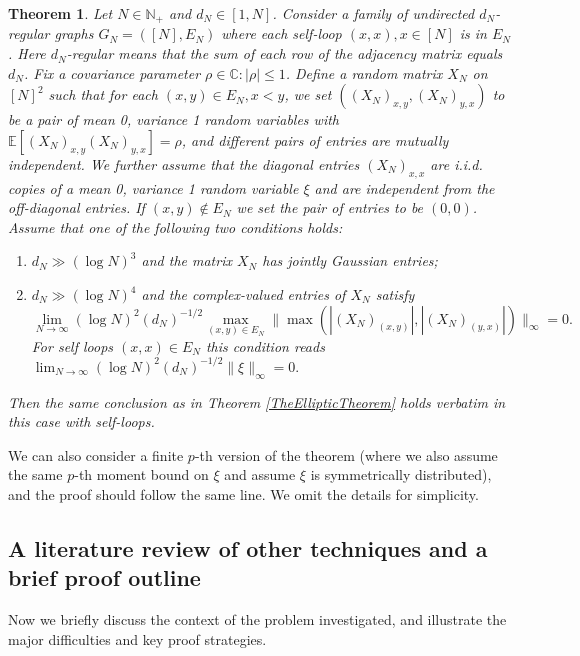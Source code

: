 \documentclass[11pt,reqno]{amsart}
\theoremstyle{plain}
\newtheorem{theorem}{Theorem}[section]
\theoremstyle{remark}
\numberwithin{equation}{section}
\begin{document}
\begin{theorem}\label{theoremlines404}
    Let $N\in\mathbb{N}_+$ and $d_N\in[1,N]$. Consider a family of undirected $d_N$-regular graphs $G_N=([N],E_N)$ where each self-loop $(x,x),x\in [N]$ is in $E_N$. Here $d_N$-regular means that the sum of each row of the adjacency matrix equals $d_N$. Fix a covariance parameter $\rho\in\mathbb{C}:|\rho|\leq 1$. Define a random matrix $X_N$ on $[N]^2$ such that for each $(x,y)
    \in E_N,x<y$, we set $((X_N)_{x,y},(X_N)_{y,x})$ to be a pair of mean 0, variance 1 random variables with $\mathbb{E}[(X_N)_{x,y}(X_N)_{y,x}]=\rho$, and different pairs of entries are mutually independent. We further assume that the diagonal entries $(X_N)_{x,x}$ are i.i.d. copies of a mean 0, variance 1 random variable $\xi$ and are independent from the off-diagonal entries. If $(x,y)\notin E_N$ we set the pair of entries to be $(0,0)$. Assume that one of the following two conditions holds:
\begin{enumerate}
    \item   $d_N\gg(\log N)^3$ and the matrix $X_N$ has jointly Gaussian entries;  \item  $d_N\gg(\log N)^4$ and the complex-valued entries of $X_N$ satisfy $$\lim_{N\to\infty} (\log N)^2 (d_N)^{-1/2}\max_{(x,y)\in E_N}{\|\max(|(X_N)_{(x,y)}|,|(X_N)_{(y,x)}|)\|_\infty}=0.$$
    For self loops $(x,x)\in E_N$ this condition reads $\lim_{N\to\infty}(\log N)^2(d_N)^{-1/2}\|\xi\|_\infty=0.$
    \end{enumerate}
    Then the same conclusion as in Theorem \ref{TheEllipticTheorem} holds verbatim in this case with self-loops.
\end{theorem}

We can also consider a finite $p$-th version of the theorem (where we also assume the same $p$-th moment bound on $\xi$ and assume $\xi$ is symmetrically distributed), and the proof should follow the same line. We omit the details for simplicity. 


\subsection{A literature review of other techniques and a brief proof outline}\label{proofoutline}
Now we briefly discuss the context of the problem investigated, and illustrate the major difficulties and key proof strategies.
\end{document}
